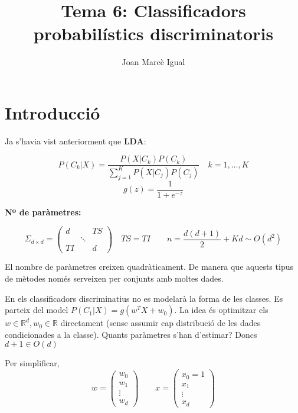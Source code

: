 \documentclass[a4paper]{article}
\title{Tema 6: Classificadors probabilístics discriminatoris}
\author{Joan Marcè Igual}
\begin{document}
\maketitle
\section{Introducció}
Ja s'havia vist anteriorment que \textbf{LDA}:

$$
P(C_k|X) = \frac{P(X|C_k)P(C_k)}{\sum_{j=1}^K P(X|C_j)P(C_j)}\quad k=1,...,K
$$
$$
g(z) = \frac{1}{1 + e^{-z}}
$$

\textbf{Nº de paràmetres:}

$$
\Sigma_{d\times d} =
\begin{pmatrix}
d & & TS \\
& \ddots & \\
TI & & d
\end{pmatrix} \quad TS = TI \qquad 
\boxed{n = \frac{d(d+1)}{2} + Kd \sim O(d^2)}
$$

El nombre de paràmetres creixen quadràticament. De manera que aquests tipus de mètodes només serveixen per conjunts amb moltes dades.

En els classificadors discriminatius no es modelarà la forma de les classes. Es parteix del model $P(C_1|X) = g(w^T X + w_0)$. La idea és optimitzar els $w \in \mathbb{R}^d,w_0 \in \mathbb{R}$ directament (sense assumir cap distribució de les dades condicionades a la classe). Quants paràmetres s'han d'estimar? Doncs $d + 1 \in O(d)$ 

Per simplificar,
$$
w = \begin{pmatrix}
w_0 \\
w_1 \\
\vdots\\
w_d
\end{pmatrix}
\qquad
x = 
\begin{pmatrix}
x_0 = 1\\
x_1\\
\vdots\\
x_d
\end{pmatrix}
$$
\end{document}
